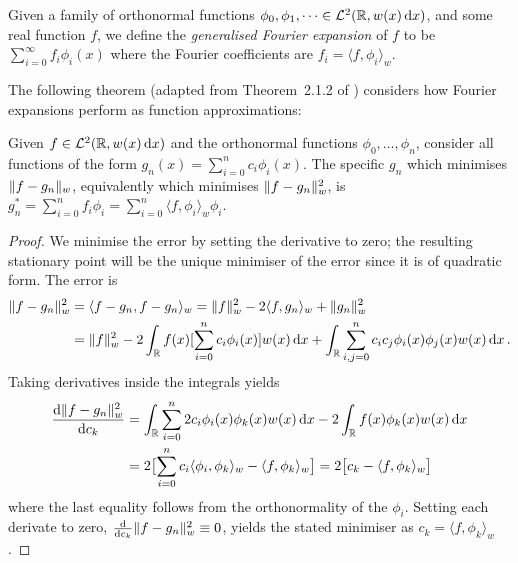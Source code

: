\begin{definition}
Given a family of orthonormal functions $\phi_0, \phi_1,\dots \in \mathcal{L}^2(\mathbb{R}, w(x) \mathop{}\!\mathrm{d} x)$, and some real function $f$, we define the \emph{generalised Fourier expansion} of $f$ to be $\sum_{i=0}^\infty f_i \phi_i(x)$ where the Fourier coefficients are $f_i = \langle f, \phi_i \rangle_w$.
\end{definition}

The following theorem (adapted from Theorem~2.1.2 of \cite{Szegoe1939}) considers how Fourier expansions perform as function approximations:

\begin{theorem}
Given $f \in \mathcal{L}^2(\mathbb{R}, w(x) \mathop{}\!\mathrm{d} x)$ and the orthonormal functions $\phi_0,\dots,\phi_n$, consider all functions of the form $g_n(x) = \sum_{i=0}^n c_i \phi_i(x)$. The specific $g_n$ which minimises $\lVert f - g_n\rVert_w$, equivalently which minimises $\lVert f - g_n\rVert_w^2$, is $g_n^* = \sum_{i=0}^n f_i \phi_i = \sum_{i=0}^n \langle f, \phi_i \rangle_w \phi_i$.
\end{theorem}
\begin{proof}
We minimise the error by setting the derivative to zero; the resulting stationary point will be the unique minimiser of the error since it is of quadratic form. The error is
\begin{align*}
\lVert f - g_n\rVert_w^2 &= \langle f-g_n, f-g_n \rangle_w = \lVert f\rVert_w^2 -2 \langle f, g_n \rangle_w + \lVert g_n\rVert_w^2 \\
&= \lVert f\rVert_w^2 - 2 \int_{\mathbb{R}} f(x) [\sum_{i=0}^n c_i \phi_i(x) ] w(x) \mathop{}\!\mathrm{d} x + \int_{\mathbb{R}} \sum_{i,j=0}^n c_i c_j \phi_i(x) \phi_j(x) w(x) \mathop{}\!\mathrm{d} x \,.
\end{align*}
Taking derivatives inside the integrals yields
\begin{align*}
\frac{\mathop{}\!\mathrm{d} \lVert f - g_n\rVert_w^2}{\mathop{}\!\mathrm{d} c_k}
&= \int_{\mathbb{R}} \sum_{i=0}^n 2 c_i \phi_i(x) \phi_k(x) w(x) \mathop{}\!\mathrm{d} x - 2 \int_{\mathbb{R}} f(x) \phi_k(x)  w(x) \mathop{}\!\mathrm{d} x \\
&= 2 \bigl[ \sum_{i=0}^n  c_i \langle \phi_i, \phi_k \rangle_w - \langle f, \phi_k \rangle_w \bigr] = 2 \bigl[ c_k - \langle f, \phi_k \rangle_w \bigr]
\end{align*}
where the last equality follows from the orthonormality of the $\phi_i$. Setting each derivate to zero, $\frac{\mathop{}\!\mathrm{d}}{\mathop{}\!\mathrm{d} c_k} \lVert f - g_n\rVert_w^2 \equiv 0$, yields the stated minimiser as $c_k = \langle f, \phi_k \rangle_w$.
\end{proof}


